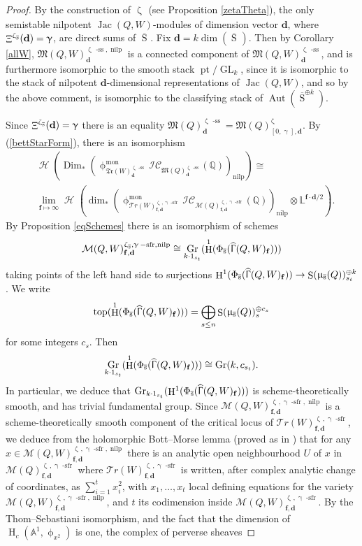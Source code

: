 \documentclass[a4paper,10pt]{amsart}
\newcommand{\dd}{\mathbf{d}}
\newcommand{\ff}{\mathbf{f}}
\DeclareMathOperator{\Simp}{S}
\DeclareMathOperator{\Top}{top}
\DeclareMathOperator{\sfr}{-sfr}
\newcommand{\WW}{\mathcal{T}r(W)}
\newcommand{\WWW}{\mathfrak{Tr}(W)}
\newcommand{\Mst}{\mathfrak{M}}
\newcommand{\Msp}{\mathcal{M}}
\newcommand{\ICS}{\mathcal{IC}}
\newcommand{\phim}[1]{\phi^{\mon}_{#1}}
\newcommand{\shave}{\overline{\Simp}_{\Ss}}
\renewcommand{\gamma}{\upgamma}
\renewcommand{\zeta}{\upzeta}
\renewcommand{\Gamma}{\Upgamma}
\renewcommand{\phi}{\upphi}
\renewcommand{\mu}{\upmu}
\DeclareMathOperator{\sst}{-ss}
\DeclareMathOperator{\nilp}{nilp}
\DeclareMathOperator{\Dim}{Dim}
\DeclareMathOperator{\mon}{mon}
\DeclareMathOperator{\Mu}{\Upxi}
\DeclareMathOperator{\Gr}{Gr}
\DeclareMathOperator{\Aut}{Aut}
\DeclareMathOperator{\Gl}{GL}
\DeclareMathOperator{\Jac}{Jac}
\DeclareMathOperator{\HGamma}{\widehat{\Gamma}}
\DeclareMathOperator{\pt}{pt}
\DeclareMathOperator{\Ss}{\overline{s}}
\DeclareMathOperator{\Ho}{\mathcal{H}}
\DeclareMathOperator{\HO}{H}
\begin{document}
\begin{proof}
By the construction of $\zeta_{\Ss}$ (see Proposition \ref{zetaTheta}), the only semistable nilpotent $\Jac(Q,W)$-modules of dimension vector $\dd$, where $\Mu^{\zeta_{\Ss}}(\dd)=\gamma$, are direct sums of $\shave$.  Fix $\dd=k\dim(\shave)$.  Then by Corollary \ref{allW}, $\Mst(Q,W)_{\dd}^{\zeta_{\Ss}\sst,\nilp}$ is a connected component of $\Mst(Q,W)^{\zeta_{\Ss}\sst}_{\dd}$, and is furthermore isomorphic to the smooth stack $\pt/ \Gl_{k}$, since it is isomorphic to the stack of nilpotent $\dd$-dimensional representations of $\Jac(Q,W)$, and so by the above comment, is isomorphic to the classifying stack of $\Aut(\shave^{\oplus k})$.

Since $\Mu^{\zeta_{\Ss}}(\dd)=\gamma$ there is an equality $\Mst(Q)_{\dd}^{\zeta_{\Ss}\sst}=\Mst(Q)_{[0,\gamma],\dd}^{\zeta_{\Ss}}$.  By (\ref{bettStarForm}), there is an isomorphism
\begin{align}\label{frexp}
&\Ho\left(\Dim_* \left(\phim{\WWW^{\zeta_{\Ss}\sst}_{\dd}}\ICS_{\Mst(Q)_{\dd}^{\zeta_{\Ss}\sst}}(\mathbb{Q})\right)_{\nilp}\right)\cong
\\&\lim_{\ff\mapsto\infty}\Ho\left(\dim_* \left(\phim{\WW^{\zeta_{\Ss},\gamma\sfr}_{\ff,\dd}}\ICS_{\Msp(Q)_{\ff,\dd}^{\zeta_{\Ss},\gamma\sfr}}(\mathbb{Q})\right)_{\nilp}\otimes\mathbb{L}^{\ff\cdot\dd/2}\right).\nonumber
\end{align}
By Proposition \ref{eqSchemes} there is an isomorphism of schemes 
\begin{align}
\label{firstGr}
\Msp(Q,W)_{\ff,\dd}^{\zeta_{\Ss},\gamma\sfr,\nilp}\cong \Gr_{k\cdot 1_{s_t}}(\HO^1(\Phi_{\Ss}(\HGamma(Q,W)_{\ff})))
\end{align}
taking points of the left hand side to surjections $\HO^1(\Phi_{\Ss}(\HGamma(Q,W)_{\ff}))\rightarrow \Simp(\mu_{\Ss}(Q))_{s_t}^{\oplus k}$.  We write 
\[
\Top(\HO^1(\Phi_{\Ss}(\HGamma(Q,W)_{\ff})))=\bigoplus_{s\leq n}\Simp(\mu_{\Ss}(Q))_s^{\oplus c_s}
\]
for some integers $c_s$.  Then 
\begin{align}
\label{secondGr}
\Gr_{k\cdot 1_{s_t}}(\HO^1(\Phi_{\Ss}(\HGamma(Q,W)_{\ff})))\cong \Gr(k,c_{s_t}).
\end{align}
In particular, we deduce that $\Gr_{k\cdot 1_{s_t}}(\HO^1(\Phi_{\Ss}(\HGamma(Q,W)_{\ff})))$ is scheme-theoretically smooth, and has trivial fundamental group.  Since $\Msp(Q,W)_{\ff,\dd}^{\zeta_{\Ss},\gamma\sfr,\nilp}$ is a scheme-theoretically smooth component of the critical locus of $\WW^{\zeta_{\Ss},\gamma\sfr}_{\ff,\dd}$, we deduce from the holomorphic Bott--Morse lemma (proved as in \cite[Lem.2.2]{Mi63}) that for any $x\in\Msp(Q,W)_{\ff,\dd}^{\zeta_{\Ss},\gamma\sfr,\nilp}$ there is an analytic open neighbourhood $U$ of $x$ in $\Msp(Q)_{\ff,\dd}^{\zeta_{\Ss},\gamma\sfr}$ where $\WW^{\zeta_{\Ss},\gamma\sfr}_{\ff,\dd}$ is written, after complex analytic change of coordinates, as $\sum_{i=1}^t x_i^2$, with $x_1,\ldots, x_t$ local defining equations for the variety $\Msp(Q,W)_{\ff,\dd}^{\zeta_{\Ss},\gamma\sfr,\nilp}$, and $t$ its codimension inside $\Msp(Q,W)_{\ff,\dd}^{\zeta_{\Ss},\gamma\sfr}$.  By the Thom--Sebastiani isomorphism, and the fact that the dimension of $\HO_c(\mathbb{A}^1,\phi_{x^2})$ is one, the complex of perverse sheaves 

\end{proof}
\end{document}

